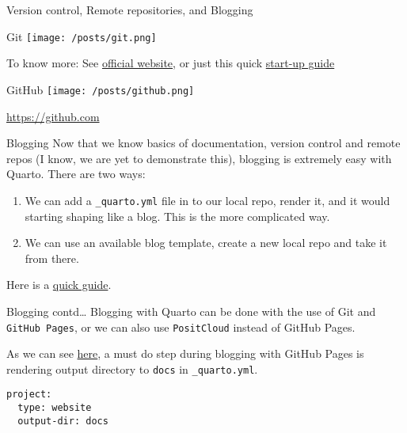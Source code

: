 \documentclass[
  ignorenonframetext,
  aspectratio=169,
]{beamer}
\providecommand{\tightlist}{%
  \setlength{\itemsep}{0pt}\setlength{\parskip}{0pt}}\usepackage{longtable,booktabs,array}
\begin{document}
\begin{frame}[fragile]{Version control, Remote repositories, and
Blogging}
\label{version-control-remote-repositories-and-blogging}
\begin{block}{Git}
\label{git}
\texttt{[image: /posts/git.png]}

To know more: See
\href{https://www.git-scm.com/book/en/v2/Getting-Started-What-is-Git\%3F}{official
website}, or just this quick
\href{https://usman-afzali.github.io/quarto-with-rstudio/posts/git/git.html}{start-up
guide}
\end{block}

\begin{block}{GitHub}
\label{github}
\texttt{[image: /posts/github.png]}

\url{https://github.com}
\end{block}

\begin{block}{Blogging}
\label{blogging}
Now that we know basics of documentation, version control and remote
repos (I know, we are yet to demonstrate this), blogging is extremely
easy with Quarto. There are two ways:

\begin{enumerate}
\tightlist
\item
  We can add a \texttt{\_quarto.yml} file in to our local repo, render
  it, and it would starting shaping like a blog. This is the more
  complicated way.
\item
  We can use an available blog template, create a new local repo and
  take it from there.
\end{enumerate}

Here is a \href{https://youtu.be/YoKjBcuUP0s}{quick guide}.
\end{block}

\begin{block}{Blogging contd\ldots{}}
\label{blogging-contd}
Blogging with Quarto can be done with the use of Git and
\texttt{GitHub\ Pages}, or we can also use \texttt{PositCloud} instead
of GitHub Pages.

As we can see
\href{https://quarto.org/docs/publishing/github-pages.html\#render-to-docs}{here},
a must do step during blogging with GitHub Pages is rendering output
directory to \texttt{docs} in \texttt{\_quarto.yml}.

\begin{verbatim}
project:
  type: website
  output-dir: docs
\end{verbatim}
\end{block}


\end{frame}
\end{document}
